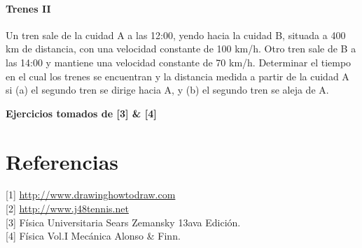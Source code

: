 \documentclass[a4paper,11pt]{article}
\theoremstyle{mytheor}
\begin{document}
\paragraph{Trenes II} Un tren sale de la cuidad A a las 12:00, yendo hacia la cuidad B, situada a 400 km de distancia, con una velocidad constante de 100 km/h. Otro tren sale de B a las 14:00 y mantiene una velocidad constante de 70 km/h. Determinar el tiempo en el cual los trenes se encuentran y la distancia medida a partir de la cuidad A si (a) el segundo tren se dirige hacia A, y (b) el segundo tren se aleja de A. 


\textbf{Ejercicios tomados de [3] \& [4]}

\section{Referencias}

[1] \url{http://www.drawinghowtodraw.com}\\

[2] \url{http://www.j48tennis.net}\\

[3] Física Universitaria Sears Zemansky 13ava Edición.\\

[4] Física Vol.I Mecánica Alonso \& Finn.
%
%
%
%
%
\end{document}
